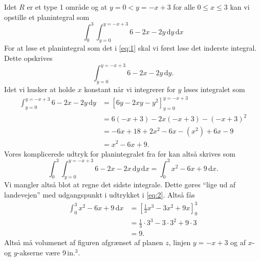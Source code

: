 \documentclass[12pt]{article}
\theoremstyle{definition}
\begin{document}
Idet $R$ er et type 1 område og at $y = 0 < y = -x + 3$ for alle $0 \leq x \leq 3$ kan vi opstille et planintegral som
\begin{equation} \label{eq:1} 
  \int_{0}^{3} \int_{y = 0}^{y = - x + 3} 6 - 2x - 2y \, \mathrm{d}y \, \mathrm{d}x   
\end{equation}
For at løse et planintegral som det i \autoref{eq:1} skal vi først løse det inderste integral. Dette opskrives
\[ 
\int_{y = 0}^{y = - x + 3} 6 - 2x - 2y \, \mathrm{d}y 
.\]
Idet vi husker at holde $x$ konstant når vi integrerer for $y$ løses integralet som
\begin{align*}
  \int_{y = 0}^{y = - x + 3} 6 - 2x - 2y \, \mathrm{d}y &= \left[ 6y-2xy-y^2 \right]_{y = 0}^{y = - x + 3} \\
  &= 6(-x + 3) - 2x(-x+3) - (-x+3)^2 \\
  &= -6x + 18 + 2x^2 - 6x -(x^2) + 6x - 9 \\
  &= x^2 - 6x + 9 
.\end{align*}
Vores komplicerede udtryk for planintegralet fra før kan altså skrives som
\begin{equation} \label{eq:2}
   \int_{0}^{3} \int_{y = 0}^{y = -x + 3} 6 - 2x - 2x \, \mathrm{d}y \, \mathrm{d}x = \int_{0}^{3} x^2 - 6x + 9 \, \mathrm{d}x 
.\end{equation}
Vi mangler altså blot at regne det sidste integrale. Dette gøres ``lige ud af landevejen'' med udgangspunkt i udtrykket i \autoref{eq:2}. Altså fås
\begin{align*}
  \int_{0}^{3} x^2 - 6x + 9 \, \mathrm{d}x &= \left[ \frac{1}{3}x^3 - 3x^2 + 9x \right]_{0}^{3} \\
  &= \frac{1}{3} \cdot 3^3 - 3 \cdot 3^2 + 9 \cdot 3 \\
  &= 9
.\end{align*}
Altså må volumenet af figuren afgrænset af planen $z$, linjen $y = -x +3$ og af $x$- og $y$-akserne være 9\,in.$^3$.
\end{document}
